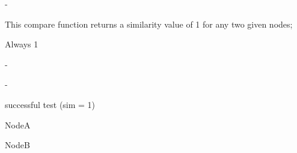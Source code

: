 

\precondition
-

\semantics
This compare function returns a similarity value of 1 for any two given nodes;

\returnvalue
Always 1

\parameters
-

\exceptions
-

\test	
	successful test (sim = 1)
  
	NodeA
	
	NodeB
	
